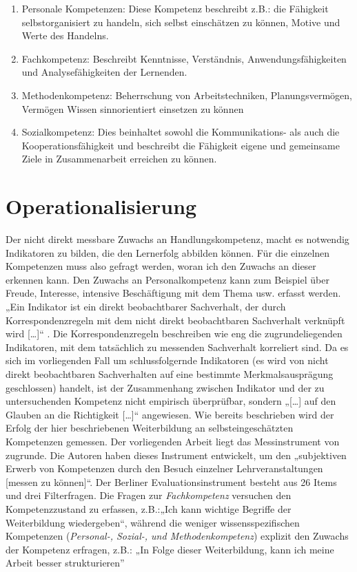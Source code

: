 \documentclass[12pt, bibliography=totoc]{scrartcl}
\begin{document}
\begin{enumerate}
\def\labelenumi{\arabic{enumi}.}
\item
  Personale Kompetenzen: Diese Kompetenz beschreibt z.B.: die Fähigkeit
  selbstorganisiert zu handeln, sich selbst einschätzen zu können,
  Motive und Werte des Handelns.
\item
  Fachkompetenz: Beschreibt Kenntnisse, Verständnis,
  Anwendungsfähigkeiten und Analysefähigkeiten der Lernenden.
\item
  Methodenkompetenz: Beherrschung von Arbeitstechniken,
  Planungsvermögen, Vermögen Wissen sinnorientiert einsetzen zu können
\item
  Sozialkompetenz: Dies beinhaltet sowohl die Kommunikations- als auch
  die Kooperationsfähigkeit und beschreibt die Fähigkeit eigene und
  gemeinsame Ziele in Zusammenarbeit erreichen zu können.
\end{enumerate}

\section{Operationalisierung}\label{operationalisierung}

Der nicht direkt messbare Zuwachs an Handlungskompetenz, macht es
notwendig Indikatoren zu bilden, die den Lernerfolg abbilden können. Für
die einzelnen Kompetenzen muss also gefragt werden, woran ich den
Zuwachs an dieser erkennen kann. Den Zuwachs an Personalkompetenz kann
zum Beispiel über Freude, Interesse, intensive Beschäftigung mit dem
Thema usw. erfasst werden. „Ein Indikator ist ein direkt beobachtbarer
Sachverhalt, der durch Korrespondenzregeln mit dem nicht direkt
beobachtbaren Sachverhalt verknüpft wird {[}\ldots{]}``
\parencite[85]{Kromrey2009}. Die Korrespondenzregeln beschreiben wie eng
die zugrundeliegenden Indikatoren, mit dem tatsächlich zu messenden
Sachverhalt korreliert sind. Da es sich im vorliegenden Fall um
schlussfolgernde Indikatoren (es wird von nicht direkt beobachtbaren
Sachverhalten auf eine bestimmte Merkmalsausprägung geschlossen)
handelt, ist der Zusammenhang zwischen Indikator und der zu
untersuchenden Kompetenz nicht empirisch überprüfbar, sondern
„{[}\ldots{]} auf den Glauben an die Richtigkeit {[}\ldots{]}``
\parencite[166]{Kromrey2009} angewiesen. Wie bereits beschrieben wird
der Erfolg der hier beschriebenen Weiterbildung an selbsteingeschätzten
Kompetenzen gemessen. Der vorliegenden Arbeit liegt das Messinstrument
von \textcite{Braun2008} zugrunde. Die Autoren haben dieses Instrument
entwickelt, um den „subjektiven Erwerb von Kompetenzen durch den Besuch
einzelner Lehrveranstaltungen {[}messen zu
können{]}``\parencite[30]{Braun2008a}. Der Berliner
Evaluationsinstrument besteht aus 26 Items und drei Filterfragen. Die
Fragen zur \emph{Fachkompetenz} versuchen den Kompetenzzustand zu
erfassen, z.B.:„Ich kann wichtige Begriffe der Weiterbildung
wiedergeben\enquote{, während die weniger wissensspezifischen
Kompetenzen (\emph{Personal-, Sozial-, und Methodenkompetenz}) explizit
den Zuwachs der Kompetenz erfragen, z.B.: „In Folge dieser
Weiterbildung, kann ich meine Arbeit besser strukturieren}
\end{document}
